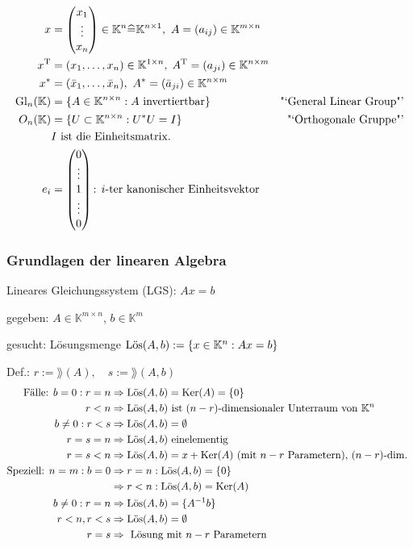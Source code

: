 \begin{align*}
x &= \begin{pmatrix} x_1 \\ \vdots \\ x_n \end{pmatrix} 
\in \mathbb{K}^n \widehat{=} \mathbb{K}^{n \times 1},  
~ A=(a_{ij}) \in \mathbb{K}^{m \times n}  \\
x^\mathrm T &= (x_1, \dots, x_n) \in \mathbb{K}^{1 \times n},\;
A^\mathrm T = (a_{ji}) \in \mathbb{K}^{n \times m}  \\ 
x^{\ast} &= (\bar{x}_1, \dots, \bar{x}_n), 
~A^{\ast} = (\bar{a}_{ji}) \in \mathbb{K}^{n \times m}  \\
\mathrm{Gl}_n(\mathbb K) &= \{A \in \mathbb{K}^{n \times n}: A 
\text{ invertiertbar} \} & \text{"`General Linear Group"'}  \\
O_n (\mathbb{K})&= \{ U \subset \mathbb{K}^{n \times n}: 
U^{\ast} U = I \} & \text{"`Orthogonale Gruppe"'} \\
& I \text{ ist die Einheitsmatrix.} \\
e_i &= \begin{pmatrix} 0 \\ \vdots \\ 1 \\ \vdots \\ 0 \end{pmatrix} 
\text{:  $i$-ter kanonischer Einheitsvektor } \\
\end{align*}

\subsubsection{Grundlagen der linearen Algebra}

Lineares Gleichungssystem (LGS): $Ax=b$

gegeben: $A \in \mathbb{K}^{m \times n}$, $b \in \mathbb{K}^m$

gesucht: Lösungsmenge $\mathrm{L\ddot{o}s}(A,b) := \{x \in \mathbb{K}^n : Ax=b\} $


Def.: $r := \rang(A),\quad s := \rang(A,b)$
\begin{align*}
\text{Fälle: } b =0 : r = n &\Rightarrow \mathrm{L\ddot{o}s}(A,b)=\operatorname*{\mathrm{Ker}}(A)=\{0\}\\
r<n &\Rightarrow \mathrm{L\ddot{o}s}(A,b) \text{ ist $(n-r)$-dimensionaler Unterraum 
von } \mathbb{K}^n \\
b \neq 0: r<s &\Rightarrow \mathrm{L\ddot{o}s}(A,b) = \emptyset \\
r=s=n &\Rightarrow \mathrm{L\ddot{o}s}(A,b) \text{ einelementig }\\
r=s<n &\Rightarrow \mathrm{L\ddot{o}s}(A,b) = x + \operatorname*{\mathrm{Ker}}(A)
\text{ (mit $n-r$ Parametern), $(n-r)$-dim. } \\
\text{Speziell: } n=m: b=0 &\Rightarrow r=n: \mathrm{L\ddot{o}s}(A,b) = \{0\}\\
&\Rightarrow r<n: \mathrm{L\ddot{o}s}(A,b) = \operatorname*{\mathrm{Ker}}(A)\\
b \neq 0: r=n &\Rightarrow \mathrm{L\ddot{o}s}(A,b) = \{A^{-1}b\}\\ 
	r<n, r<s &\Rightarrow \mathrm{L\ddot{o}s}(A,b) = \emptyset \\
	 r=s &\Rightarrow \text{ Lösung mit $n-r$ Parametern } \\
\end{align*} 


